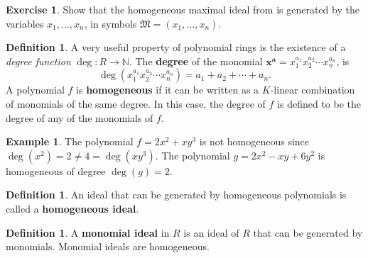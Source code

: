 \documentclass[11pt]{amsart}
\newcommand{\m}{{\mathfrak M}}
\newcommand{\N}{{\mathbb N}}
\newcommand{\ba}{{\mathbf a}}
\newcommand{\bx}{{\mathbf x}}
\theoremstyle{plain} %
\theoremstyle{definition}
\newtheorem{defn}[thm]{Definition}
\newtheorem{ex}[thm]{Example}
\newtheorem{exer}[thm]{Exercise}
\theoremstyle{remark}
\numberwithin{equation}{section}  %
\begin{document}
\begin{tcolorbox}[reset]
\begin{exer}
Show that the homogeneous maximal ideal from  is generated by the variables $x_1, \ldots, x_n$, in symbols  $\m=(x_1,\ldots, x_n)$.
\end{exer}
\end{tcolorbox}

\begin{tcolorbox}
\begin{defn}
A very useful property of polynomial rings is the existence of a {\em degree function} $\deg:R\to\N$.
The {\bf degree} of the monomial $\bx^\ba =x_1^{a_1}x_2^{a_2} \cdots x_n^{a_n}$, is 
\[
\deg(x_1^{a_1}x_2^{a_2} \cdots x_n^{a_n} )=a_1+a_2+\cdots+a_n.
\]
A polynomial $f$ is {\bf homogeneous} if it can be written as a $K$-linear combination of monomials of the same degree. In this case, the degree of $f$ is defined to be the degree of any of the monomials of $f$.
\end{defn}
\end{tcolorbox}


\begin{ex}
The polynomial $f=2x^2+xy^3$ is not homogeneous since $\deg(x^2)=2\neq 4=\deg(xy^3)$. The polynomial $g=2x^2-xy+6y^2$ is homogeneous of degree $\deg (g)=2$.
\end{ex}

%





\begin{tcolorbox}
\begin{defn}
An ideal that can be generated by homogeneous polynomials is called a {\bf homogeneous ideal}.
\end{defn}
\end{tcolorbox}

\begin{tcolorbox}
\begin{defn} A {\bf monomial ideal} in $R$ is an ideal of $R$ that can be generated by monomials. Monomial ideals are homogeneous.
\end{defn}
\end{tcolorbox}
\end{document}
